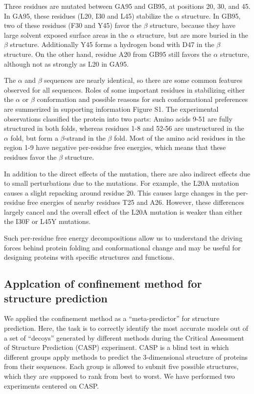 \documentclass[12pt]{article}
\begin{document}
Three residues are mutated between GA95 and GB95, at positions 20, 30, and 45. In GA95, these
residues (L20, I30 and L45) stabilize the $\alpha$ structure. In GB95, two of these residues (F30
and Y45) favor the $\beta$ structure, because they have large solvent exposed surface areas in the
$\alpha$ structure, but are more buried in the $\beta$ structure. Additionally Y45 forms a hydrogen
bond with D47 in the $\beta$ structure. On the other hand, residue A20 from GB95 still favors the
$\alpha$ structure, although not as strongly as L20 in GA95.

The $\alpha$ and $\beta$ sequences are nearly identical, so there are some common features observed for all
sequences. Roles of some important residues in stabilizing either the $\alpha$ or $\beta$
conformation and possible reasons for such conformational preferences are summerized in 
supporting information Figure S1. The experimental observations
classified the protein into two parts: Amino acids 9-51 are fully structured in both folds, whereas
residues 1-8 and 52-56 are unstructured in the $\alpha$ fold, but form a $\beta$-strand in the
$\beta$ fold. Most of the amino acid residues in the region 1-9 have negative per-residue free
energies, which means that these residues favor the $\beta$ structure.

In addition to the direct effects of the mutation, there are also indirect effects due to small
perturbations due to the mutations. For example, the L20A mutation causes a slight repacking around
residue 20. This causes large changes in the per-residue free energies of nearby residues T25 and
A26. However, these differences largely cancel and the overall effect of the L20A mutation is weaker
than either the I30F or L45Y mutations.

Such per-residue free energy decompositions allow us to understand the driving forces behind protein
folding and conformational change and may be useful for designing proteins with specific structures
and functions.

\subsection{Applcation of confinement method for structure prediction}

We applied the confinement method as a ``meta-predictor'' for structure prediction. Here, the
task is to correctly identify the most accurate models out of a set of ``decoys'' generated by
different methods during the Critical Assessment of Structure Prediction (CASP) experiment. CASP is
a blind test in which different groups apply methods to predict the 3-dimensional structure of
proteins from their sequences. Each group is allowed to submit five
possible structures, which they are supposed to rank from best to worst. We have performed two
experiments centered on CASP.
\end{document}
